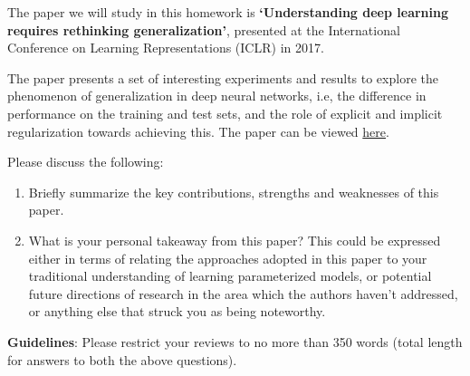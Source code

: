
The paper we will study in this homework is \textbf{`Understanding deep learning requires rethinking generalization'}, presented at the International Conference on Learning Representations (ICLR) in 2017.

The paper presents a set of interesting experiments and results to explore the phenomenon of generalization in deep neural networks, i.e, the difference in performance on the training and test sets, and the role of explicit and implicit regularization towards achieving this. The paper can be viewed \href{https://arxiv.org/abs/1611.03530}{here}.

Please discuss the following:
\begin{enumerate}
\item
Briefly summarize the key contributions, strengths and weaknesses of this paper.

\item
What is your personal takeaway from this paper? This could be expressed either in terms of relating the approaches adopted in this paper to your traditional understanding of learning parameterized models, or potential future directions of research in the area which the authors haven't addressed, or anything else that struck you as being noteworthy. 
\end{enumerate}

\textbf{Guidelines}: Please restrict your reviews to no more than 350 words (total length for answers to both the above questions).